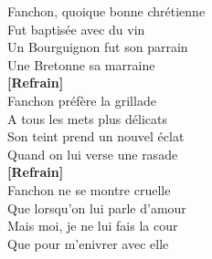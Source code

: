 \documentclass{novel}
\begin{document}
Fanchon, quoique bonne chrétienne \\
Fut baptisée avec du vin \\
Un Bourguignon fut son parrain \\
Une Bretonne sa marraine \\

\textbf{[Refrain]} \\

Fanchon préfère la grillade \\
A tous les mets plus délicats \\
Son teint prend un nouvel éclat \\
Quand on lui verse une rasade \\

\textbf{[Refrain]} \\

Fanchon ne se montre cruelle \\
Que lorsqu'on lui parle d'amour \\
Mais moi, je ne lui fais la cour \\
Que pour m'enivrer avec elle
\end{document}
